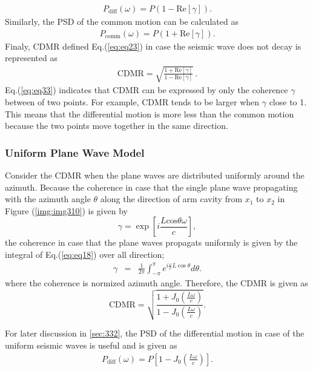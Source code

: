 \begin{eqnarray} \label{eq:eq32}
  P_{\mathrm{diff}}(\omega) = P (1-\mathrm{Re}\left[\gamma\right]).
\end{eqnarray}
Similarly, the PSD of the common motion can be calculated as
\begin{eqnarray}
  P_{\mathrm{comm}}(\omega) = P (1+\mathrm{Re}\left[\gamma\right]).
\end{eqnarray}
Finaly, CDMR defined Eq.(\ref{eq:eq23}) in case the seismic wave does not decay is represented as
\begin{eqnarray}
 \mathrm{CDMR} = \sqrt{\frac{1 + \mathrm{Re} \left[\gamma \right] }{1 - \mathrm{Re} \left[\gamma \right]}}\,. \label{eq:eq33}
\end{eqnarray}
Eq.(\ref{eq:eq33}) indicates that CDMR can be expressed by only the coherence $\gamma$ between of two points. For example, CDMR tends to be larger when $\gamma$ close to 1. This means that the differential motion is more less than the common motion because the two points move together in the same direction.


\subsubsection{Uniform Plane Wave Model}
Consider the CDMR when the plane waves are distributed uniformly around the azimuth. Because the coherence in case that the single plane wave propagating with the azimuth angle $\theta$ along the direction of arm cavity from $x_1$ to $x_2$ in Figure (\ref{img:img310}) is given by
\begin{equation}
  \gamma = \exp\left[{i\frac{L\mathrm{cos}\theta\omega}{c}}\right], \label{eq:eq18}
\end{equation} 
the coherence in case that the plane waves propagats uniformly is given by the integral of Eq.(\ref{eq:eq18}) over all direction;
\begin{eqnarray} \label{eq:eq19}
  \gamma &=& \frac{1}{2\pi} \int_{-\pi}^{\pi} e^{i\frac{\omega}{c} L\cos \theta} d \theta .
\end{eqnarray}
where the coherence is normized azimuth angle. Therefore, the CDMR is given as
\begin{equation}  \label{eq:eq20}
  \mathrm{CDMR} = \sqrt{\frac{1+J_0(\frac{L\omega}{c})}{1-J_0(\frac{L\omega}{c})}} .
\end{equation}

For later discussion in \cref{sec:332}, the PSD of the differential motion in case of the uniform seismic waves is useful and is given as
\begin{eqnarray} \label{eq:eq21}
  P_{\mathrm{diff}}(\omega) = P \left[1-J_0\left(\frac{L\omega}{c}\right)\right] .
\end{eqnarray}

